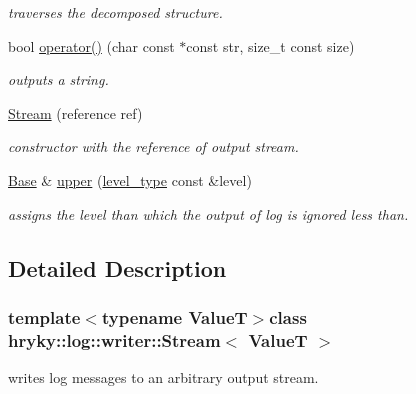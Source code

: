 \begin{DoxyCompactItemize}
\begin{DoxyCompactList}\small\item\em traverses the decomposed structure. \end{DoxyCompactList}\item 
bool \hyperlink{classhryky_1_1log_1_1writer_1_1_base_af3dfcf1de847d720eb7dba2ca9476b4e}{operator()} (char const $\ast$const str, size\-\_\-t const size)
\begin{DoxyCompactList}\small\item\em outputs a string. \end{DoxyCompactList}\item 
\hypertarget{classhryky_1_1log_1_1writer_1_1_stream_a7b27b6dde500b43a948077d1fabe0084}{\hyperlink{classhryky_1_1log_1_1writer_1_1_stream_a7b27b6dde500b43a948077d1fabe0084}{Stream} (reference ref)}\label{classhryky_1_1log_1_1writer_1_1_stream_a7b27b6dde500b43a948077d1fabe0084}

\begin{DoxyCompactList}\small\item\em constructor with the reference of output stream. \end{DoxyCompactList}\item 
\hypertarget{classhryky_1_1log_1_1writer_1_1_base_a802841d14501e525139b9b27c1e9c6f2}{\hyperlink{classhryky_1_1log_1_1writer_1_1_base}{Base} \& \hyperlink{classhryky_1_1log_1_1writer_1_1_base_a802841d14501e525139b9b27c1e9c6f2}{upper} (\hyperlink{classhryky_1_1log_1_1level_1_1_entity}{level\-\_\-type} const \&level)}\label{classhryky_1_1log_1_1writer_1_1_base_a802841d14501e525139b9b27c1e9c6f2}

\begin{DoxyCompactList}\small\item\em assigns the level than which the output of log is ignored less than. \end{DoxyCompactList}\end{DoxyCompactItemize}


\subsection{Detailed Description}
\subsubsection*{template$<$typename Value\-T$>$class hryky\-::log\-::writer\-::\-Stream$<$ Value\-T $>$}

writes log messages to an arbitrary output stream. 

